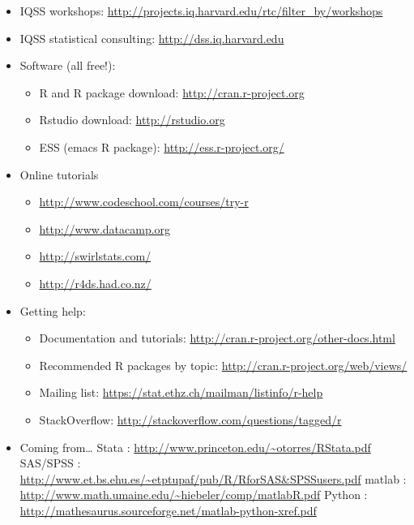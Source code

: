 \documentclass[]{book}
\providecommand{\tightlist}{%
  \setlength{\itemsep}{0pt}\setlength{\parskip}{0pt}}
\begin{document}
\begin{itemize}
\tightlist
\item
  IQSS workshops:
  \url{http://projects.iq.harvard.edu/rtc/filter_by/workshops}
\item
  IQSS statistical consulting: \url{http://dss.iq.harvard.edu}
\item
  Software (all free!):

  \begin{itemize}
  \tightlist
  \item
    R and R package download: \url{http://cran.r-project.org}
  \item
    Rstudio download: \url{http://rstudio.org}
  \item
    ESS (emacs R package): \url{http://ess.r-project.org/}
  \end{itemize}
\item
  Online tutorials

  \begin{itemize}
  \tightlist
  \item
    \url{http://www.codeschool.com/courses/try-r}
  \item
    \url{http://www.datacamp.org}
  \item
    \url{http://swirlstats.com/}
  \item
    \url{http://r4ds.had.co.nz/}
  \end{itemize}
\item
  Getting help:

  \begin{itemize}
  \tightlist
  \item
    Documentation and tutorials:
    \url{http://cran.r-project.org/other-docs.html}
  \item
    Recommended R packages by topic:
    \url{http://cran.r-project.org/web/views/}
  \item
    Mailing list: \url{https://stat.ethz.ch/mailman/listinfo/r-help}
  \item
    StackOverflow: \url{http://stackoverflow.com/questions/tagged/r}
  \end{itemize}
\item
  Coming from\ldots{} Stata :
  \url{http://www.princeton.edu/~otorres/RStata.pdf} SAS/SPSS :
  \url{http://www.et.bs.ehu.es/~etptupaf/pub/R/RforSAS\&SPSSusers.pdf}
  matlab : \url{http://www.math.umaine.edu/~hiebeler/comp/matlabR.pdf}
  Python :
  \url{http://mathesaurus.sourceforge.net/matlab-python-xref.pdf}
\end{itemize}
\end{document}
